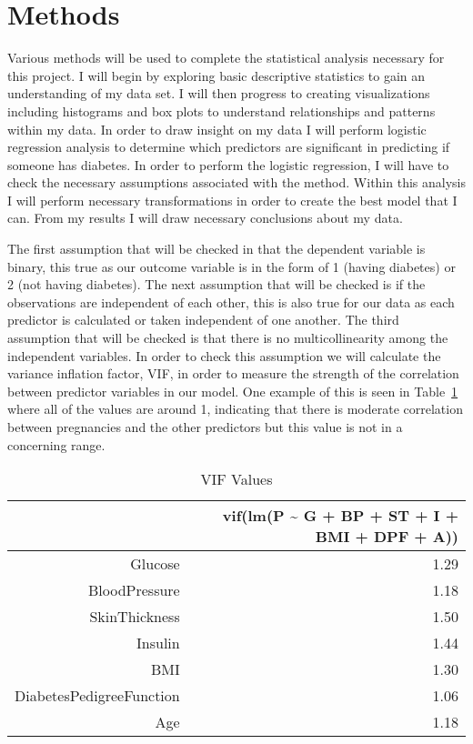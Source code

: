 \documentclass[12pt]{article}
\begin{document}
\section{Methods}
\label{sec:meth}
    Various methods will be used to complete the statistical analysis necessary for this project. I will begin by exploring basic descriptive statistics to gain an understanding of my data set. I will then progress to creating visualizations including histograms and box plots to understand relationships and patterns within my data. In order to draw insight on my data I will perform logistic regression analysis to determine which predictors are significant in predicting if someone has diabetes. In order to perform the logistic regression, I will have to check the necessary assumptions associated with the method. Within this analysis I will perform necessary transformations in order to create the best model that I can. From my results I will draw necessary conclusions about my data.
    
    The first assumption that will be checked in that the dependent variable is binary, this true as our outcome variable is in the form of 1 (having diabetes) or 2 (not having diabetes). The next assumption that will be checked is if the observations are independent of each other, this is also true for our data as each predictor is calculated or taken independent of one another. The third assumption that will be checked is that there is no multicollinearity among the independent variables. In order to check this assumption we will calculate the variance inflation factor, VIF, in order to measure the strength of the correlation between predictor variables in our model. One example of this is seen in Table~\ref{tab:vif} where all of the values are around 1, indicating that there is moderate correlation between pregnancies and the other predictors but this value is not in a concerning range. 

\begin{table}[ht]
\caption{VIF Values} 
\label{tab:vif}
\centering
\begin{tabular}{rr}
  \hline
 & vif(lm(P \~{} G + BP + ST + I + BMI + DPF + A)) \\ 
  \hline
Glucose & 1.29 \\ 
  BloodPressure & 1.18 \\ 
  SkinThickness & 1.50 \\ 
  Insulin & 1.44 \\ 
  BMI & 1.30 \\ 
  DiabetesPedigreeFunction & 1.06 \\ 
  Age & 1.18 \\ 
   \hline
\end{tabular}
\end{table}
\end{document}

